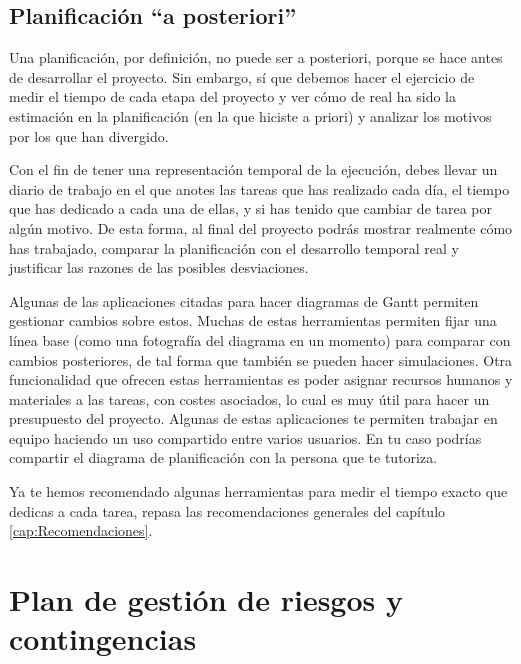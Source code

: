 \subsection{Planificación ``a posteriori''}

Una planificación, por definición, no puede ser a posteriori, porque se hace antes de desarrollar el proyecto. Sin embargo, sí que debemos hacer el ejercicio de medir el tiempo de cada etapa del proyecto y ver cómo de real ha sido la estimación en la planificación (en la que hiciste a priori) y analizar los motivos por los que han divergido.

Con el fin de tener una representación temporal de la ejecución, debes llevar un diario de trabajo en el que anotes las tareas que has realizado cada día, el tiempo que has dedicado a cada una de ellas, y si has tenido que cambiar de tarea por algún motivo. De esta forma, al final del proyecto podrás mostrar realmente cómo has trabajado, comparar la planificación con el desarrollo temporal real y justificar las razones de las posibles desviaciones.


Algunas de las aplicaciones citadas para hacer diagramas de Gantt permiten gestionar cambios sobre estos. Muchas de estas herramientas permiten fijar una línea base (como una fotografía del diagrama en un momento) para comparar con cambios posteriores, de tal forma que también se pueden hacer simulaciones. Otra funcionalidad que ofrecen estas herramientas es poder asignar recursos humanos y materiales a las tareas, con costes asociados, lo cual es muy útil para hacer un presupuesto del proyecto. Algunas de estas aplicaciones te permiten trabajar en equipo haciendo un uso compartido entre varios usuarios. En tu caso podrías compartir el diagrama de planificación con la persona que te tutoriza.

Ya te hemos recomendado algunas herramientas para medir el tiempo exacto que dedicas a cada tarea, repasa las recomendaciones generales del capítulo \ref{cap:Recomendaciones}.



\section{Plan de gestión de riesgos y contingencias}

